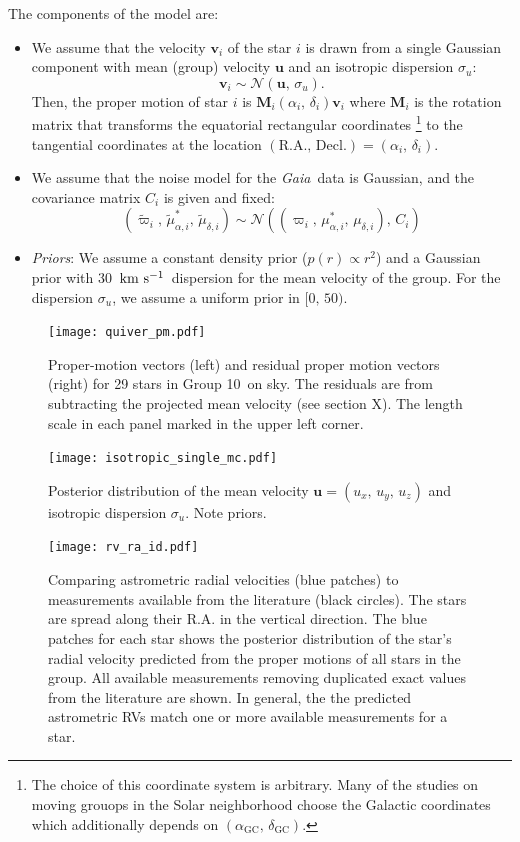 \documentclass[modern,letterpaper]{aastex61}
\newcommand{\project}[1]{\textsl{#1}}
\newcommand{\gaia}{\project{Gaia}}
\newcommand{\groupTen}{Group 10}
\newcommand{\normal}{{\mathcal{N}}}
\newcommand{\bs}[1]{\boldsymbol{#1}}
\newcommand{\mat}[1]{\mathbf{#1}}
\renewcommand{\vec}[1]{\bs{#1}}
\newcommand{\kms}{\ensuremath{\rm km~s^{-1}}}
\newcommand{\todo}[1]{{\color{crimson}#1}}
\begin{document}
The components of the model are:
\begin{itemize}
  \item We assume that the velocity $\vec{v}_i$ of the star $i$ is drawn from
    a single Gaussian component with mean (group) velocity $\vec{u}$ and
    an isotropic dispersion $\sigma_{u}$:
    $$\vec{v}_i \sim \normal(\vec{u},\,\sigma_{u}).$$
    Then, the proper motion of star $i$ is $\mat{M}_i(\alpha_i,\,\delta_i)\vec{v}_i$ where
    $\mat{M}_i$ is the rotation matrix that transforms the equatorial rectangular coordinates
    \footnote{The choice of this coordinate system is arbitrary. Many of the studies on
      moving grouops in the Solar neighborhood choose the Galactic coordinates which additionally
      depends on $(\alpha_\mathrm{GC},\,\delta_\mathrm{GC})$.
    }
    to the tangential coordinates at the location $(\mathrm{R.A.},\,\mathrm{Decl.}) = (\alpha_i,\,\delta_i)$.

  \item We assume that the noise model for the \gaia\ data is Gaussian, and
    the covariance matrix $C_i$ is given and fixed:
    $$(\tilde\varpi_i,\,\tilde\mu_{\alpha,i}^*,\,\tilde\mu_{\delta,i}) \sim
      \normal((\varpi_i,\,\mu_{\alpha,i}^*,\,\mu_{\delta,i}),\,C_i)$$

  \item \emph{Priors}: We assume a constant density prior ($p(r) \propto r^2$) and a Gaussian
    prior with 30~\kms\ dispersion for the mean velocity of the group.
    For the dispersion $\sigma_u$, we assume a uniform prior in $[0,\,50)$.
\end{itemize}


\begin{figure}
  \centering
  \texttt{[image: quiver\_pm.pdf]}
  \caption{Proper-motion vectors (left) and residual proper motion vectors (right)
    for 29 stars in \groupTen\ on sky.
    The residuals are from subtracting the projected mean velocity (\todo{see section X}).
    The length scale in each panel marked in the upper left corner.
  }
  \label{fig:quiver_pm}
\end{figure}

\begin{figure}
  \centering
  \texttt{[image: isotropic\_single\_mc.pdf]}
  \caption{
    Posterior distribution of the mean velocity $\vec{u} = (u_x,\,u_y,\,u_z)$ and
    isotropic dispersion $\sigma_u$.
    Note priors.
  }
  \label{fig:fit}
\end{figure}

\begin{figure}
  \centering
  \texttt{[image: rv\_ra\_id.pdf]}
  \caption{
    Comparing astrometric radial velocities (blue patches) to
    measurements available from the literature (black circles).
    The stars are spread along their R.A. in the vertical direction.
    The blue patches for each star shows the posterior distribution
    of the star's radial velocity predicted from the proper motions of
    all stars in the group.
    All available measurements removing duplicated exact values from
    the literature are shown.
    In general, the the predicted astrometric RVs match one or more
    available measurements for a star.
  }
  \label{fig:rv_ra_id}
\end{figure}
\end{document}
